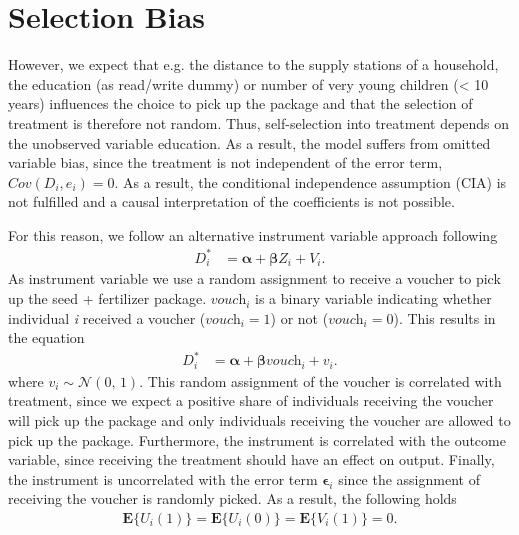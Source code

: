 \section{Selection Bias} \label{sec:selection}

However, we expect that e.g. the distance to the supply stations of a household, the education (as read/write dummy) or number of very young children (< 10 years) influences the choice to pick up the package and that the selection of treatment is therefore not random. Thus, self-selection into treatment depends on the unobserved variable education. As a result, the model suffers from omitted variable bias, since the treatment is not independent of the error term, $Cov(\textit{D}_i, \textit{e}_i) = 0$. As a result, the conditional independence assumption (CIA) is not fulfilled and a causal interpretation of the coefficients is not possible.

For this reason, we follow an alternative instrument variable approach following 
\begin{align}
	\label{eq:eq8}
	\textit{D}_i^\ast &= \boldsymbol{\alpha} + \boldsymbol{\beta} \textit{Z}_i + \textit{V}_i.
\end{align}
As instrument variable we use a random assignment to receive a voucher to pick up the seed + fertilizer package. $\textit{vouch}_i$ is a binary variable indicating whether individual \textit{i} received a voucher ($\textit{vouch}_i = 1$) or not ($\textit{vouch}_i = 0$). This results in the equation
\begin{align}
	\label{eq:eq9}
	\textit{D}_i^\ast &= \boldsymbol{\alpha} + \boldsymbol{\beta} \textit{vouch}_i + \textit{v}_i.
\end{align}
where $\textit{v}_i \sim \mathcal{N}(0,\,1)$. This random assignment of the voucher is correlated with treatment, since we expect a positive share of individuals receiving the voucher will pick up the package and only individuals receiving the voucher are allowed to pick up the package. Furthermore, the instrument is correlated with the outcome variable, since receiving the treatment should have an effect on output. Finally, the instrument is uncorrelated with the error term $\boldsymbol{\epsilon}_i$ since the assignment of receiving the voucher is randomly picked. As a result, the following holds
\begin{align}
	\label{eq:eq10}
	\boldsymbol{E}\{\textit{U}_i(1)\} = \boldsymbol{E}\{\textit{U}_i(0)\} = \boldsymbol{E}\{\textit{V}_i(1)\} = 0.
\end{align}


